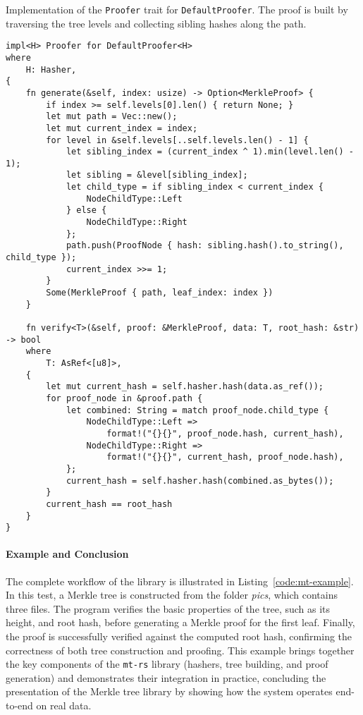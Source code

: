 \begin{listing}[!htp]
\caption{Implementation of the \texttt{Proofer} trait for \texttt{DefaultProofer}. The proof is built by traversing the tree levels and collecting sibling hashes along the path.}
\label{code:default-proofer}
\begin{verbatim}
impl<H> Proofer for DefaultProofer<H>
where
    H: Hasher,
{
    fn generate(&self, index: usize) -> Option<MerkleProof> {
        if index >= self.levels[0].len() { return None; }
        let mut path = Vec::new();
        let mut current_index = index;
        for level in &self.levels[..self.levels.len() - 1] {
            let sibling_index = (current_index ^ 1).min(level.len() - 1);
            let sibling = &level[sibling_index];
            let child_type = if sibling_index < current_index {
                NodeChildType::Left
            } else {
                NodeChildType::Right
            };
            path.push(ProofNode { hash: sibling.hash().to_string(), child_type });
            current_index >>= 1;
        }
        Some(MerkleProof { path, leaf_index: index })
    }

    fn verify<T>(&self, proof: &MerkleProof, data: T, root_hash: &str) -> bool
    where
        T: AsRef<[u8]>,
    {
        let mut current_hash = self.hasher.hash(data.as_ref());
        for proof_node in &proof.path {
            let combined: String = match proof_node.child_type {
                NodeChildType::Left => 
                    format!("{}{}", proof_node.hash, current_hash),
                NodeChildType::Right => 
                    format!("{}{}", current_hash, proof_node.hash),
            };
            current_hash = self.hasher.hash(combined.as_bytes());
        }
        current_hash == root_hash
    }
}
\end{verbatim}
\end{listing}

\newpage

\paragraph{Example and Conclusion}  
The complete workflow of the library is illustrated in Listing~\ref{code:mt-example}.
In this test, a Merkle tree is constructed from the folder \emph{pics}, which contains three files. The program verifies the basic properties of the tree, such as its height, and root hash, before generating a Merkle proof for the first leaf.  
Finally, the proof is successfully verified against the computed root hash, confirming the correctness of both tree construction and proofing. This example brings together the key components of the \texttt{mt-rs} library (hashers, tree building, and proof generation) and demonstrates their integration in practice, concluding the presentation of the Merkle tree library by showing how the system operates end-to-end on real data.


